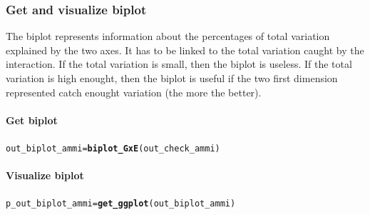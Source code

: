 \documentclass{article}\usepackage[]{graphicx}\usepackage[]{color}
\makeatletter
\newcommand{\hlstd}[1]{\textcolor[rgb]{0.345,0.345,0.345}{#1}}%
\newcommand{\hlkwb}[1]{\textcolor[rgb]{0.69,0.353,0.396}{#1}}%
\newcommand{\hlkwd}[1]{\textcolor[rgb]{0.737,0.353,0.396}{\textbf{#1}}}%
\newenvironment{kframe}{%
 \def\at@end@of@kframe{}%
 \ifinner\ifhmode%
  \def\at@end@of@kframe{\end{minipage}}%
  \begin{minipage}{\columnwidth}%
 \fi\fi%
 \def\FrameCommand##1{\hskip\@totalleftmargin \hskip-\fboxsep
 \colorbox{shadecolor}{##1}\hskip-\fboxsep
     \hskip-\linewidth \hskip-\@totalleftmargin \hskip\columnwidth}%
 \MakeFramed {\advance\hsize-\width
   \@totalleftmargin\z@ \linewidth\hsize
   \@setminipage}}%
 {\par\unskip\endMakeFramed%
 \at@end@of@kframe}
\newenvironment{knitrout}{}{} %
\makeatother
\begin{document}
\subsubsection{Get and visualize biplot}

The biplot represents information about the percentages of total variation explained by the two axes.
It has to be linked to the total variation caught by the interaction.
If the total variation is small, then the biplot is useless.
If the total variation is high enought, then the biplot is useful if the two first dimension represented catch enought variation (the more the better).

\paragraph{Get biplot}

\begin{knitrout}
\color{fgcolor}\begin{kframe}
\begin{alltt}
\hlstd{out_biplot_ammi} \hlkwb{=} \hlkwd{biplot_GxE}\hlstd{(out_check_ammi)}
\end{alltt}
\end{kframe}
\end{knitrout}

\paragraph{Visualize biplot}

\begin{knitrout}
\color{fgcolor}\begin{kframe}
\begin{alltt}
\hlstd{p_out_biplot_ammi} \hlkwb{=} \hlkwd{get_ggplot}\hlstd{(out_biplot_ammi)}
\end{alltt}
\end{kframe}
\end{knitrout}
\end{document}
